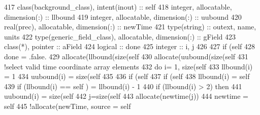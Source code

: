 \begin{DoxyCode}
417     \textcolor{keywordtype}{class}(background\_class), \textcolor{keywordtype}{intent(inout)} :: self
418     \textcolor{keywordtype}{integer}, \textcolor{keywordtype}{allocatable}, \textcolor{keywordtype}{dimension(:)} :: llbound
419     \textcolor{keywordtype}{integer}, \textcolor{keywordtype}{allocatable}, \textcolor{keywordtype}{dimension(:)} :: uubound
420     \textcolor{keywordtype}{real(prec)}, \textcolor{keywordtype}{allocatable}, \textcolor{keywordtype}{dimension(:)} :: newTime
421     \textcolor{keywordtype}{type}(string) :: outext, name, units
422     \textcolor{keywordtype}{type}(generic\_field\_class), \textcolor{keywordtype}{allocatable}, \textcolor{keywordtype}{dimension(:)} :: gField
423     \textcolor{keywordtype}{class}(*), \textcolor{keywordtype}{pointer} :: aField
424     \textcolor{keywordtype}{logical} :: done
425     \textcolor{keywordtype}{integer} :: i, j
426 
427     \textcolor{keywordflow}{if} (self%
428         done = .false.
429         \textcolor{keyword}{allocate}(llbound(\textcolor{keyword}{size}(self%
430         \textcolor{keyword}{allocate}(uubound(\textcolor{keyword}{size}(self%
431         \textcolor{comment}{!select valid time coordinate array elements}
432         \textcolor{keywordflow}{do} i= 1, \textcolor{keyword}{size}(self%
433             llbound(i) = 1
434             uubound(i) = \textcolor{keyword}{size}(self%
435 
436             \textcolor{keywordflow}{if} (self%
437                 \textcolor{keywordflow}{if} (self%
438                     llbound(i) = self%
439                     \textcolor{keywordflow}{if} (llbound(i) == self%
      ) = llbound(i) - 1
440                     \textcolor{keywordflow}{if} (llbound(i) > 2) \textcolor{keywordflow}{then}
441                         uubound(i) = \textcolor{keyword}{size}(self%
442                         j=\textcolor{keyword}{size}(self%
443                         \textcolor{keyword}{allocate}(newtime(j))
444                         newtime = self%
445                         \textcolor{comment}{!allocate(newTime, source = self%
}
\end{DoxyCode}
